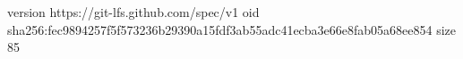 version https://git-lfs.github.com/spec/v1
oid sha256:fec9894257f5f573236b29390a15fdf3ab55adc41ecba3e66e8fab05a68ee854
size 85
